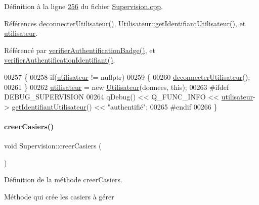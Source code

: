 Définition à la ligne \hyperlink{_supervision_8cpp_source_l00256}{256} du fichier \hyperlink{_supervision_8cpp_source}{Supervision.\+cpp}.



Références \hyperlink{_supervision_8cpp_source_l00076}{deconnecter\+Utilisateur()}, \hyperlink{_utilisateur_8cpp_source_l00078}{Utilisateur\+::get\+Identifiant\+Utilisateur()}, et \hyperlink{_supervision_8h_source_l00082}{utilisateur}.



Référencé par \hyperlink{_supervision_8cpp_source_l00124}{verifier\+Authentification\+Badge()}, et \hyperlink{_supervision_8cpp_source_l00141}{verifier\+Authentification\+Identifiant()}.


\begin{DoxyCode}
00257 \{
00258     \textcolor{keywordflow}{if}(\hyperlink{class_supervision_a92384f2b12b2549cee988f83add8ad49}{utilisateur} != \textcolor{keyword}{nullptr})
00259     \{
00260         \hyperlink{class_supervision_a164a1ad89264ea252401818df325eab8}{deconnecterUtilisateur}();
00261     \}
00262     \hyperlink{class_supervision_a92384f2b12b2549cee988f83add8ad49}{utilisateur} = \textcolor{keyword}{new} \hyperlink{class_utilisateur}{Utilisateur}(donnees, \textcolor{keyword}{this});
00263 \textcolor{preprocessor}{    #ifdef DEBUG\_SUPERVISION}
00264         qDebug() << Q\_FUNC\_INFO << \hyperlink{class_supervision_a92384f2b12b2549cee988f83add8ad49}{utilisateur}->
      \hyperlink{class_utilisateur_af944ac02cca7914480e20f46c4dd0e56}{getIdentifiantUtilisateur}() << \textcolor{stringliteral}{"authentifié"};
00265 \textcolor{preprocessor}{    #endif}
00266 \}
\end{DoxyCode}
\mbox{\label{class_supervision_a558665fd7e7c44653907883afd9a58bf}} 
\paragraph{\texorpdfstring{creer\+Casiers()}{creerCasiers()}}
{\footnotesize\ttfamily void Supervision\+::creer\+Casiers (\begin{DoxyParamCaption}{ }\end{DoxyParamCaption})}



Définition de la méthode creer\+Casiers. 

Méthode qui crée les casiers à gérer 

